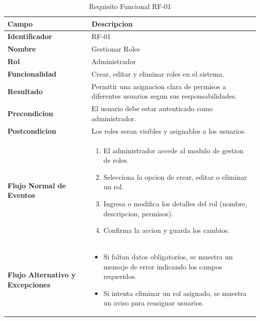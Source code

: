 \begin{table}[htb!]
    \centering
    \caption{Requisito Funcional RF-01}
\begin{tabular}{|p{4cm}|p{12cm}|}
\hline
\textbf{Campo} & \textbf{Descripcion} \\ \hline
\textbf{Identificador} & RF-01 \\ \hline
\textbf{Nombre} & Gestionar Roles \\ \hline
\textbf{Rol} & Administrador \\ \hline
\textbf{Funcionalidad} & Crear, editar y eliminar roles en el sistema. \\ \hline
\textbf{Resultado} & Permitir una asignacion clara de permisos a diferentes usuarios segun sus responsabilidades. \\ \hline
\textbf{Precondicion} & El usuario debe estar autenticado como administrador. \\ \hline
\textbf{Postcondicion} & Los roles seran visibles y asignables a los usuarios. \\ \hline
\textbf{Flujo Normal de Eventos} & 
\begin{enumerate}
    \item El administrador accede al modulo de gestion de roles. 
    \item Selecciona la opcion de crear, editar o eliminar un rol. 
    \item Ingresa o modifica los detalles del rol (nombre, descripcion, permisos).
    \item Confirma la accion y guarda los cambios.  
\end{enumerate}
\\ \hline 
\textbf{Flujo Alternativo y Excepciones} & 
\begin{itemize}
    \item Si faltan datos obligatorios, se muestra un mensaje de error indicando los campos requeridos. 
    \item Si intenta eliminar un rol asignado, se muestra un aviso para reasignar usuarios. 
    
\end{itemize}
\\ \hline
\end{tabular}
\end{table}
\FloatBarrier


